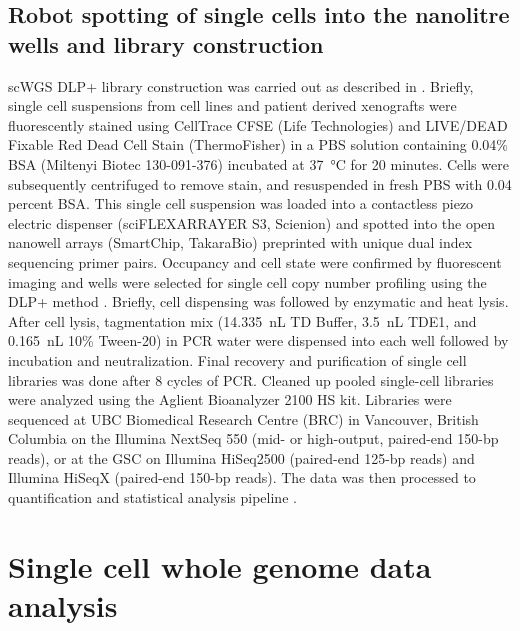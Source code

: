 \subsection{Robot spotting of single cells into the nanolitre wells and library construction}
scWGS DLP+ library construction was carried out as described in \cite{laks2019clonal}. Briefly, single cell suspensions from cell lines and patient derived xenografts were fluorescently stained using CellTrace CFSE (Life Technologies) and LIVE/DEAD Fixable Red Dead Cell Stain (ThermoFisher) in a PBS solution containing 0.04\% BSA (Miltenyi Biotec 130-091-376) incubated at \SI{37}{\degreeCelsius} for 20 minutes. Cells were subsequently centrifuged to remove stain, and resuspended in fresh PBS with 0.04 percent BSA. This single cell suspension was loaded into a contactless piezo electric dispenser (sciFLEXARRAYER S3, Scienion) and spotted into the open nanowell arrays (SmartChip, TakaraBio) preprinted with unique dual index sequencing primer pairs. Occupancy and cell state were confirmed by fluorescent imaging and wells were selected for single cell copy number profiling using the DLP+ method \cite{laks2019clonal}. Briefly, cell dispensing was followed by enzymatic and heat lysis. After cell lysis, tagmentation mix 
(\SI{14.335}{\nano\liter} TD Buffer, \SI{3.5}{\nano\liter} TDE1, and \SI{0.165}{\nano\liter} 10\% Tween-20) in PCR water were dispensed into each well followed by incubation and neutralization. Final recovery and purification of single cell libraries was done after 8 cycles of PCR. Cleaned up pooled single-cell libraries were analyzed using the Aglient Bioanalyzer 2100 HS kit. Libraries were sequenced at UBC Biomedical Research Centre (BRC) in Vancouver, British Columbia on the Illumina NextSeq 550 (mid- or high-output, paired-end 150-bp reads), or at the GSC on Illumina HiSeq2500 (paired-end 125-bp reads) and Illumina HiSeqX (paired-end 150-bp reads). The data was then processed to quantification and statistical analysis pipeline \cite{laks2019clonal}.

\section{Single cell whole genome data analysis}
